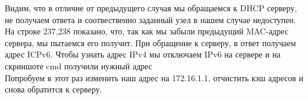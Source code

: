 \documentclass[a4paper,12pt]{article}
\begin{document}
\begin{figure}[H]
\end{figure}
Видим, что в отличие от предыдущего случая мы обращаемся к DHCP серверу,
не получаем ответа и соотвественно заданный узел в нашем случае недоступен.
На строке 237,238 показано, что, так как мы забыли предыдущий MAC-адрес сервера, мы пытаемся 
его получит. При обращение к серверу, в ответ получаем адрес ICPv6.
Чтобы узнать адрес IPv4 мы отключаем IPv6 на сервере и на скриншоте cmd получили нужный адрес\\
Попробуем в этот раз изменить наш адрес на 172.16.1.1, отчистить кэш адресов
и снова обратится к серверу.
\begin{figure}[H]
\end{figure}
\end{document}
